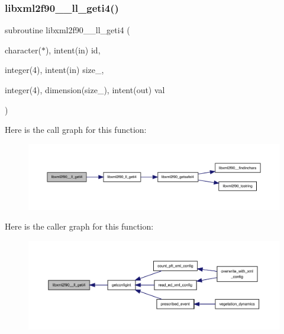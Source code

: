 \subsubsection{\texorpdfstring{libxml2f90\+\_\+\+\_\+ll\+\_\+geti4()}{libxml2f90\_\_ll\_geti4()}}
{\footnotesize\ttfamily subroutine libxml2f90\+\_\+\+\_\+ll\+\_\+geti4 (\begin{DoxyParamCaption}\item[{character($\ast$), intent(in)}]{id,  }\item[{integer(4), intent(in)}]{size\+\_\+,  }\item[{integer(4), dimension(size\+\_\+), intent(out)}]{val }\end{DoxyParamCaption})}

Here is the call graph for this function\+:
\nopagebreak
\begin{figure}[H]
\begin{center}
\leavevmode
\includegraphics[width=350pt]{libxml2f90_8f90__pp_8f90_a90fdd12e3f7794c98317d1b08550f01f_cgraph}
\end{center}
\end{figure}
Here is the caller graph for this function\+:
\nopagebreak
\begin{figure}[H]
\begin{center}
\leavevmode
\includegraphics[width=350pt]{libxml2f90_8f90__pp_8f90_a90fdd12e3f7794c98317d1b08550f01f_icgraph}
\end{center}
\end{figure}
\mbox{\label{libxml2f90_8f90__pp_8f90_a1c2a48ca65f77d8c56223d71e08ced37}} 
